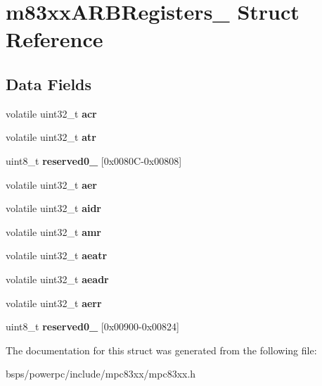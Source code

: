 \hypertarget{structm83xxARBRegisters__}{}\section{m83xx\+A\+R\+B\+Registers\+\_\+ Struct Reference}
\label{structm83xxARBRegisters__}
\subsection*{Data Fields}
\begin{DoxyCompactItemize}
\item 
\mbox{\label{structm83xxARBRegisters___ac60687e7eabfe7472977ff317a910b97}} 
volatile uint32\+\_\+t {\bfseries acr}
\item 
\mbox{\label{structm83xxARBRegisters___af5836085a48cb53ce286a25eaffbeaac}} 
volatile uint32\+\_\+t {\bfseries atr}
\item 
\mbox{\label{structm83xxARBRegisters___aaca14d933ae0e4b0d81713439357cebd}} 
uint8\+\_\+t {\bfseries reserved0\+\_} \mbox{[}0x0080\+C-\/0x00808\mbox{]}
\item 
\mbox{\label{structm83xxARBRegisters___aba2b6d79ad433db109ff1ec28cdccf36}} 
volatile uint32\+\_\+t {\bfseries aer}
\item 
\mbox{\label{structm83xxARBRegisters___a3a05c4a5da0834139871938acc5c4039}} 
volatile uint32\+\_\+t {\bfseries aidr}
\item 
\mbox{\label{structm83xxARBRegisters___a75ae2944d2bd10afb9d573381af5a3a2}} 
volatile uint32\+\_\+t {\bfseries amr}
\item 
\mbox{\label{structm83xxARBRegisters___a2483b336a8aa04747540e4d5f3bfd479}} 
volatile uint32\+\_\+t {\bfseries aeatr}
\item 
\mbox{\label{structm83xxARBRegisters___ac899b74f3f317c92703bf00ae86d8530}} 
volatile uint32\+\_\+t {\bfseries aeadr}
\item 
\mbox{\label{structm83xxARBRegisters___a4e3c0682be35b592a14e2bf83beafb96}} 
volatile uint32\+\_\+t {\bfseries aerr}
\item 
\mbox{\label{structm83xxARBRegisters___a64a0880d50fc93f56e2461f104f0bd52}} 
uint8\+\_\+t {\bfseries reserved0\+\_} \mbox{[}0x00900-\/0x00824\mbox{]}
\end{DoxyCompactItemize}


The documentation for this struct was generated from the following file\+:\begin{DoxyCompactItemize}
\item 
bsps/powerpc/include/mpc83xx/mpc83xx.\+h\end{DoxyCompactItemize}
